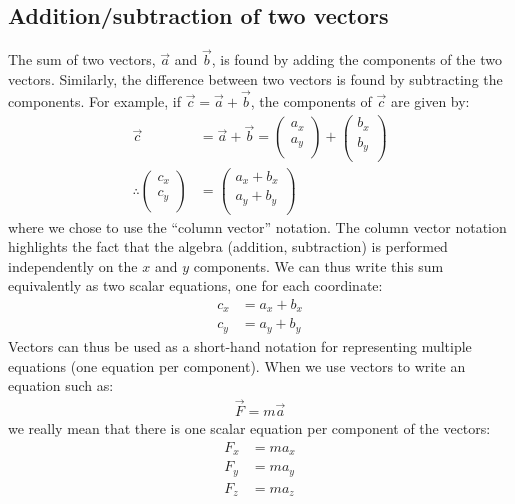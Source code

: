 \subsection{Addition/subtraction of two vectors}
The sum of two vectors, $\vec a$ and $\vec b$, is found by adding the components of the two vectors. Similarly, the difference between two vectors is found by subtracting the components. For example, if $\vec c=\vec a+\vec b$, the components of $\vec c$ are given by:
\begin{align*}
\vec c &= \vec a + \vec b = \begin{pmatrix}
           a_x \\
           a_y \\
         \end{pmatrix} + \begin{pmatrix}
           b_x \\
           b_y \\
         \end{pmatrix}\\
        \therefore \begin{pmatrix}
           c_x \\
           c_y \\
         \end{pmatrix} &=\begin{pmatrix}
           a_x+b_x \\
           a_y+b_y \\
         \end{pmatrix}
\end{align*}
where we chose to use the ``column vector'' notation. The column vector notation highlights the fact that the algebra (addition, subtraction) is performed independently on the $x$ and $y$ components. We can thus write this sum equivalently as two scalar equations, one for each coordinate:
\begin{align*}
c_x &= a_x+b_x\\
c_y &= a_y+b_y
\end{align*}
Vectors can thus be used as a short-hand notation for representing multiple equations (one equation per component). When we use vectors to write an equation such as:
\begin{align*}
\vec F = m\vec a
\end{align*}
we really mean that there is one scalar equation per component of the vectors:
\begin{align*}
F_x &= ma_x\\
F_y &= ma_y\\
F_z &= ma_z
\end{align*}

